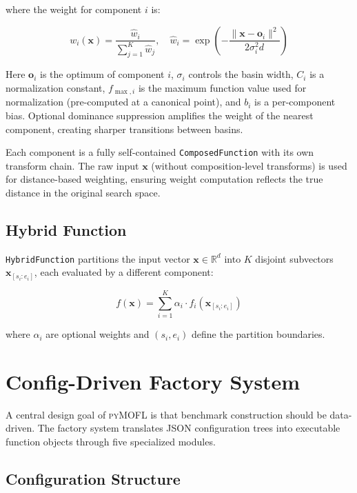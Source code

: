 \documentclass[11pt,a4paper]{article}
\newcommand{\pymofl}{\textsc{pyMOFL}}
\newcommand{\R}{\mathbb{R}}
\begin{document}
\noindent where the weight for component $i$ is:

\begin{equation}
w_i(\mathbf{x}) = \frac{\hat{w}_i}{\sum_{j=1}^{K} \hat{w}_j}, \quad
\hat{w}_i = \exp\!\left(-\frac{\|\mathbf{x} - \mathbf{o}_i\|^2}{2\sigma_i^2 d}\right)
\label{eq:weights}
\end{equation}

Here $\mathbf{o}_i$ is the optimum of component $i$, $\sigma_i$ controls the
basin width, $C_i$ is a normalization constant, $f_{\max,i}$ is the maximum
function value used for normalization (pre-computed at a canonical point), and
$b_i$ is a per-component bias. Optional dominance suppression amplifies the
weight of the nearest component, creating sharper transitions between basins.

Each component is a fully self-contained \texttt{ComposedFunction} with its own
transform chain. The raw input $\mathbf{x}$ (without composition-level
transforms) is used for distance-based weighting, ensuring weight computation
reflects the true distance in the original search space.

\subsection{Hybrid Function}

\texttt{HybridFunction} partitions the input vector $\mathbf{x} \in \R^d$ into
$K$ disjoint subvectors $\mathbf{x}_{[s_i:e_i]}$, each evaluated by a
different component:

\begin{equation}
f(\mathbf{x}) = \sum_{i=1}^{K} \alpha_i \cdot f_i(\mathbf{x}_{[s_i:e_i]})
\label{eq:hybrid}
\end{equation}

\noindent where $\alpha_i$ are optional weights and $(s_i, e_i)$ define the
partition boundaries.

\section{Config-Driven Factory System}\label{sec:factory}

A central design goal of \pymofl{} is that benchmark construction should be
data-driven. The factory system translates JSON configuration trees into
executable function objects through five specialized modules.

\subsection{Configuration Structure}
\end{document}
